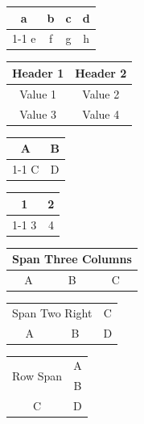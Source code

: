 \documentclass{article}
\begin{document}
\begin{tabular}{cccc}
  a & b & c & d \\
  \cline{1-1}\cline{3-3}
  e & f & g & h \\
\end{tabular}

\begin{tabular}{cc}
  \toprule
  Header 1 & Header 2 \\
  \midrule
  Value 1 & Value 2 \\
  Value 3 & Value 4 \\
  \bottomrule
\end{tabular}

\begin{tabular}{cc}
  \toprule
  A & B \\
  \cmidrule{1-1}\cmidrule{2-2}
  C & D \\
  \bottomrule
\end{tabular}

\begin{tabular}{cc}
  \toprule
  1 & 2 \\
  \cmidrule(r){1-1}
  3 & 4 \\
  \bottomrule
\end{tabular}

\begin{tabular}{|c|c|c|}
  \hline
  \multicolumn{3}{|c|}{Span Three Columns} \\
  \hline
  A & B & C \\
\end{tabular}

\begin{tabular}{ccc}
  \multicolumn{2}{r}{Span Two Right} & C \\
  A & B & D \\
\end{tabular}

\begin{tabular}{cc}
  \multirow{2}{*}{Row Span} & A \\
                            & B \\
  C                         & D \\
\end{tabular}
\end{document}
